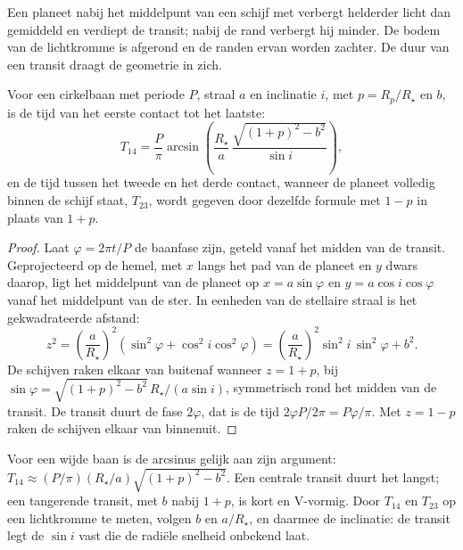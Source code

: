 Een planeet nabij het middelpunt van een schijf met  verbergt helderder licht
dan gemiddeld en verdiept de transit; nabij de rand verbergt hij minder. De
bodem van de lichtkromme is afgerond en de randen ervan worden zachter. De duur
van een transit draagt de geometrie in zich.

\begin{theorem}[Transitduur]\label{thm:b3:exoplanets:duration}
Voor een cirkelbaan met periode $P$, straal $a$ en inclinatie $i$, met
$p = R_p/R_\star$ en  $b$, is de tijd van het eerste
contact tot het laatste:
\[
T_{14} = \frac{P}{\pi}\arcsin\!\left(\frac{R_\star}{a}\,
          \frac{\sqrt{(1 + p)^2 - b^2}}{\sin i}\right),
\]
en de tijd tussen het tweede en het derde contact, wanneer de planeet
volledig binnen de schijf staat, $T_{23}$, wordt gegeven door dezelfde formule
met $1 - p$ in plaats van $1 + p$.
\end{theorem}

\begin{proof}
Laat $\varphi = 2\pi t/P$ de baanfase zijn, geteld vanaf het midden van de transit.
Geprojecteerd op de hemel, met $x$ langs het pad van de planeet en $y$ dwars daarop,
ligt het middelpunt van de planeet op $x = a\sin\varphi$ en $y = a\cos i\cos\varphi$
vanaf het middelpunt van de ster. In eenheden van de stellaire straal is het gekwadrateerde afstand:
\[
z^2 = \left(\frac{a}{R_\star}\right)^2(\sin^2\varphi + \cos^2 i\cos^2\varphi)
    = \left(\frac{a}{R_\star}\right)^2\sin^2 i\,\sin^2\varphi + b^2 .
\]
De schijven raken elkaar van buitenaf wanneer $z = 1 + p$, bij
$\sin\varphi = \sqrt{(1 + p)^2 - b^2}\,R_\star/(a\sin i)$, symmetrisch
rond het midden van de transit. De transit duurt de fase $2\varphi$, dat is de
tijd $2\varphi P/2\pi = P\varphi/\pi$. Met $z = 1 - p$ raken de schijven
elkaar van binnenuit.
\end{proof}

Voor een wijde baan is de arcsinus gelijk aan zijn argument: $T_{14} \approx (P/\pi)
(R_\star/a)\sqrt{(1 + p)^2 - b^2}$. Een centrale transit duurt het langst; een
tangerende transit, met $b$ nabij $1 + p$, is kort en V-vormig. Door
$T_{14}$ en $T_{23}$ op een lichtkromme te meten, volgen $b$ en $a/R_\star$, en daarmee de
inclinatie: de transit legt de $\sin i$ vast die de radiële
snelheid onbekend laat.

